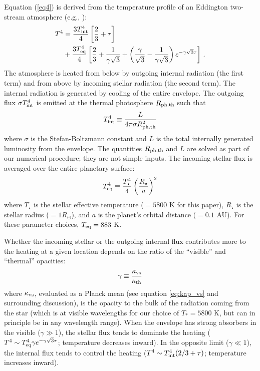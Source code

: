 \documentclass[fleqn,useAMS,usenatbib]{mnras}
\begin{document}
Equation (\ref{eq4}) is derived from the temperature
profile of an Eddington two-stream
atmosphere (e.g., \citealt{guillot10}):
%
\begin{align}
    T^4 &= \frac{3T^4_{\rm int}}{4}\left[\frac{2}{3} + \tau\right] \nonumber \\
    &+ \frac{3T_{\rm eq}^4}{4}\left[\frac{2}{3}+\frac{1}{\gamma\sqrt{3}}+\left(\frac{\gamma}{\sqrt{3}}-\frac{1}{\gamma\sqrt{3}}\right)e^{-\gamma\sqrt{3}\tau}\right] \,.
\label{eq5}
\end{align}
%
The atmosphere is heated from below by outgoing internal radiation
(the first term) and from above by incoming stellar radiation
(the second term). 
The internal radiation is generated by cooling of the entire
envelope. The outgoing flux $\sigma T_{\rm int}^4$ is emitted
at the thermal
photosphere $R_{\rm ph,th}$ such that
%
\begin{equation}
    T_{\rm int}^4 \equiv \frac{L}{4\pi\sigma R_{\rm ph,th}^2}
    \label{eq6}
\end{equation}
%
where $\sigma$ is the Stefan-Boltzmann constant
and $L$ is the total internally generated luminosity from the envelope.
The quantities $R_{\rm ph,th}$ and $L$ are solved
as part of our numerical procedure; they are not simple inputs.
The incoming stellar flux is averaged over the entire planetary surface:
\begin{equation}
    T_{\rm eq}^4 \equiv \frac{T_{\star}^4}{4}\left(\frac{R_\star}{a}\right)^2
    \label{eq8}
\end{equation}
where $T_{\star}$ is the stellar effective temperature ($=5800$ K
for this paper), $R_\star$ is the stellar radius ($=1 R_\odot$),
and $a$ is the planet's orbital distance ($=0.1$ AU).
For these parameter choices, $T_{\rm eq} = 883$ K.

Whether the incoming stellar or the outgoing internal flux contributes
more to the heating at a given location depends on the ratio of the
``visible'' and ``thermal'' opacities:
%
\begin{equation}
    \gamma \equiv \frac{\kappa_{\rm vs}}{\kappa_{\rm th}}
    \label{eq7}
\end{equation}
%
where $\kappa_{\rm vs}$, evaluated
as a Planck mean (see equation \ref{eq:kap_vs}
and surrounding discussion), is the opacity to 
the bulk of the radiation coming from the star 
(which is at visible wavelengths for our choice of $T_\ast = 5800$ K,
but can in principle be in any wavelength range).
When the envelope has strong absorbers in the visible
($\gamma \gg 1$), the stellar flux tends to
dominate the heating
($T^4 \sim T_{\rm eq}^4 \gamma e^{-\gamma \sqrt{3}\tau}$; temperature decreases inward).
In the opposite limit ($\gamma \ll 1$), the internal flux
tends to control the heating ($T^4 \sim T_{\rm int}^4(2/3+\tau)$;
temperature increases inward).
\end{document}
